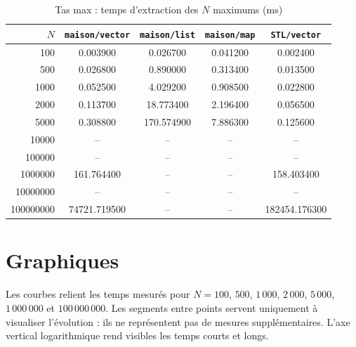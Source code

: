 \documentclass[12pt,a4paper]{article}
\begin{document}
\begin{table}[htbp]
\centering
\caption{Tas max : temps d'extraction des $N$ maximums (ms)}
\label{tab:max-extraction}
\small
\begin{tabular}{r S[table-format=6.6] S[table-format=6.6] S[table-format=6.6] S[table-format=6.6]}
\toprule
{$N$} & {\texttt{maison/vector}} & {\texttt{maison/list}} & {\texttt{maison/map}} & {\texttt{STL/vector}} \\
       & 0.003900 & 0.026700 & 0.041200 & 0.002400 \\
500       & 0.026800 & 0.890000 & 0.313400 & 0.013500 \\
1000      & 0.052500 & 4.029200 & 0.908500 & 0.022800 \\
2000      & 0.113700 & 18.773400 & 2.196400 & 0.056500 \\
5000      & 0.308800 & 170.574900 & 7.886300 & 0.125600 \\
10000     &  &  &  &  \\
100000    &  &  &  &  \\
1000000   & 161.764400 &  &  & 158.403400 \\
10000000  &  &  &  &  \\
100000000 & 74721.719500 &  &  & 182454.176300 \\
\bottomrule
\end{tabular}
\end{table}

\clearpage
\section{Graphiques}

Les courbes relient les temps mesurés pour $N=100$, $500$, $1\,000$,
$2\,000$, $5\,000$, $1\,000\,000$ et $100\,000\,000$. Les segments entre
points servent uniquement à visualiser l'évolution : ils ne représentent pas
de mesures supplémentaires. L'axe vertical logarithmique rend visibles les
temps courts et longs.

\end{document}
